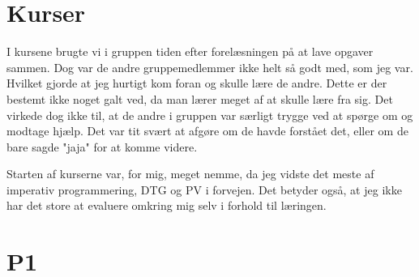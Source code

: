 \documentclass[10pt,a4paper]{article}
\begin{document}
\section*{Kurser}
I kursene brugte vi i gruppen tiden efter forelæsningen på at lave opgaver sammen. Dog var de andre gruppemedlemmer ikke helt så godt med, som jeg var. Hvilket gjorde at jeg hurtigt kom foran og skulle lære de andre. Dette er der bestemt ikke noget galt ved, da man lærer meget af at skulle lære fra sig. Det virkede dog ikke til, at de andre i gruppen var særligt trygge ved at spørge om og modtage hjælp. Det var tit svært at afgøre om de havde forstået det, eller om de bare sagde "jaja" for at komme videre.

Starten af kurserne var, for mig, meget nemme, da jeg vidste det meste af imperativ programmering, DTG og PV i forvejen. Det betyder også, at jeg ikke har det store at evaluere omkring mig selv i forhold til læringen.

\section*{P1}
\end{document}
